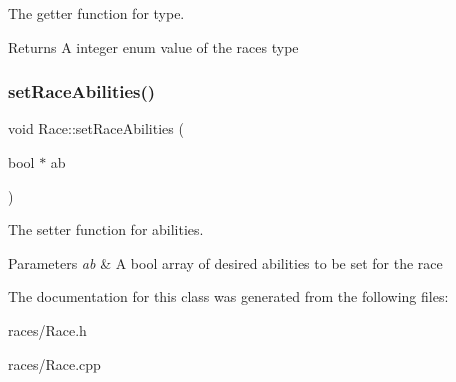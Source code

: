 The getter function for type. 

\begin{DoxyReturn}{Returns}
A integer enum value of the race\textquotesingle{}s type 
\end{DoxyReturn}
\mbox{\label{class_race_a920ae703837c0514eb9a45eb0453ac0e}} 
\subsubsection{\texorpdfstring{setRaceAbilities()}{setRaceAbilities()}}
{\footnotesize\ttfamily void Race\+::set\+Race\+Abilities (\begin{DoxyParamCaption}\item[{bool $\ast$}]{ab }\end{DoxyParamCaption})}



The setter function for abilities. 


\begin{DoxyParams}{Parameters}
{\em ab} & A bool array of desired abilities to be set for the race \\
\hline
\end{DoxyParams}


The documentation for this class was generated from the following files\+:\begin{DoxyCompactItemize}
\item 
races/Race.\+h\item 
races/Race.\+cpp\end{DoxyCompactItemize}
